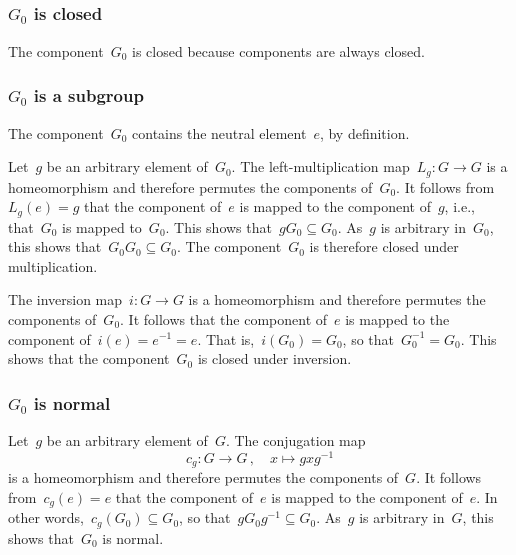 \subsection{}



\subsubsection*{$G_0$ is closed}

The component~$G_0$ is closed because components are always closed.



\subsubsection*{$G_0$ is a subgroup}

The component~$G_0$ contains the neutral element~$e$, by definition.

Let~$g$ be an arbitrary element of~$G_0$.
The left-multiplication map~$L_g \colon G \to G$ is a homeomorphism and therefore permutes the components of~$G_0$.
It follows from~$L_g(e) = g$ that the component of~$e$ is mapped to the component of~$g$, i.e., that~$G_0$ is mapped to~$G_0$.
This shows that~$g G_0 ⊆ G_0$.
As~$g$ is arbitrary in~$G_0$, this shows that~$G_0 G_0 ⊆ G_0$.
The component~$G_0$ is therefore closed under multiplication.

The inversion map~$i \colon G \to G$ is a homeomorphism and therefore permutes the components of~$G_0$.
It follows that the component of~$e$ is mapped to the component of~$i(e) = e^{-1} = e$.
That is,~$i(G_0) = G_0$, so that~$G_0^{-1} = G_0$.
This shows that the component~$G_0$ is closed under inversion.



\subsubsection*{$G_0$ is normal}

Let~$g$ be an arbitrary element of~$G$.
The conjugation map
\[
	c_g
	\colon
	G \to G \,,
	\quad
	x \mapsto g x g^{-1}
\]
is a homeomorphism and therefore permutes the components of~$G$.
It follows from~$c_g(e) = e$ that the component of~$e$ is mapped to the component of~$e$.
In other words,~$c_g(G_0) ⊆ G_0$, so that~$g G_0 g^{-1} ⊆ G_0$.
As~$g$ is arbitrary in~$G$, this shows that~$G_0$ is normal.
